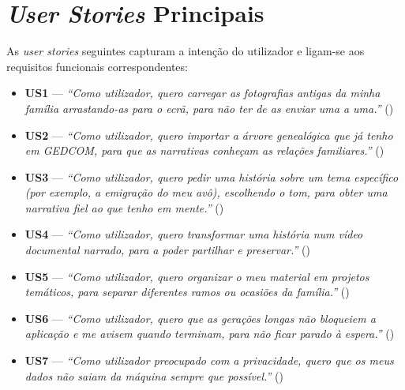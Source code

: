 \section{\emph{User Stories} Principais}
\label{sec:user_stories}

As \emph{user stories} seguintes capturam a intenção do utilizador e
ligam-se aos requisitos funcionais correspondentes:

\begin{itemize}[leftmargin=*]
  \item \textbf{US1} — \emph{``Como utilizador, quero carregar as
  fotografias antigas da minha família arrastando-as para o ecrã, para
  não ter de as enviar uma a uma.''} ()
  \item \textbf{US2} — \emph{``Como utilizador, quero importar a árvore
  genealógica que já tenho em GEDCOM, para que as narrativas conheçam as
  relações familiares.''} ()
  \item \textbf{US3} — \emph{``Como utilizador, quero pedir uma história
  sobre um tema específico (por exemplo, a emigração do meu avô),
  escolhendo o tom, para obter uma narrativa fiel ao que tenho em
  mente.''} ()
  \item \textbf{US4} — \emph{``Como utilizador, quero transformar uma
  história num vídeo documental narrado, para a poder partilhar e
  preservar.''} ()
  \item \textbf{US5} — \emph{``Como utilizador, quero organizar o meu
  material em projetos temáticos, para separar diferentes ramos ou
  ocasiões da família.''} ()
  \item \textbf{US6} — \emph{``Como utilizador, quero que as gerações
  longas não bloqueiem a aplicação e me avisem quando terminam, para não
  ficar parado à espera.''} ()
  \item \textbf{US7} — \emph{``Como utilizador preocupado com a
  privacidade, quero que os meus dados não saiam da máquina sempre que
  possível.''} ()
\end{itemize}
